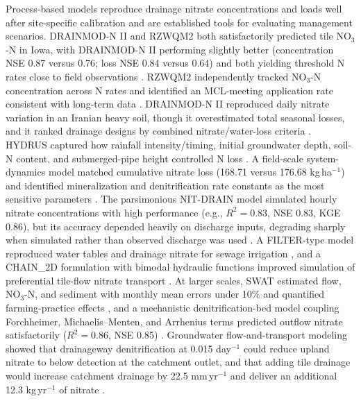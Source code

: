 Process-based models reproduce drainage nitrate concentrations and loads well after site-specific calibration and are established tools for evaluating management scenarios. DRAINMOD-N II and RZWQM2 both satisfactorily predicted tile NO$_3$-N in Iowa, with DRAINMOD-N II performing slightly better (concentration NSE 0.87 versus 0.76; loss NSE 0.84 versus 0.64) and both yielding threshold N rates close to field observations \parencite{Du2017}. RZWQM2 independently tracked NO$_3$-N concentration across N rates and identified an MCL-meeting application rate consistent with long-term data \parencite{Qi2012}. DRAINMOD-N II reproduced daily nitrate variation in an Iranian heavy soil, though it overestimated total seasonal losses, and it ranked drainage designs by combined nitrate/water-loss criteria \parencite{Hashemi2020}. HYDRUS captured how rainfall intensity/timing, initial groundwater depth, soil-N content, and submerged-pipe height controlled N loss \parencite{Tao2021}. A field-scale system-dynamics model matched cumulative nitrate loss (168.71 versus 176.68 kg\,ha$^{-1}$) and identified mineralization and denitrification rate constants as the most sensitive parameters \parencite{Matinzadeh2017}. The parsimonious NIT-DRAIN model simulated hourly nitrate concentrations with high performance (e.g., $R^2=0.83$, NSE 0.83, KGE 0.86), but its accuracy depended heavily on discharge inputs, degrading sharply when simulated rather than observed discharge was used \parencite{Chelil2022}. A FILTER-type model reproduced water tables and drainage nitrate for sewage irrigation \parencite{Yang2008}, and a CHAIN\_2D formulation with bimodal hydraulic functions improved simulation of preferential tile-flow nitrate transport \parencite{Mohanty1998}. At larger scales, SWAT estimated flow, NO$_3$-N, and sediment with monthly mean errors under 10\% and quantified farming-practice effects \parencite{Chaplot2004}, and a mechanistic denitrification-bed model coupling Forchheimer, Michaelis--Menten, and Arrhenius terms predicted outflow nitrate satisfactorily ($R^2=0.86$, NSE 0.85) \parencite{Ghane2015}. Groundwater flow-and-transport modeling showed that drainageway denitrification at 0.015 day$^{-1}$ could reduce upland nitrate to below detection at the catchment outlet, and that adding tile drainage would increase catchment drainage by 22.5 mm\,yr$^{-1}$ and deliver an additional 12.3 kg\,yr$^{-1}$ of nitrate \parencite{Schilling2007}.